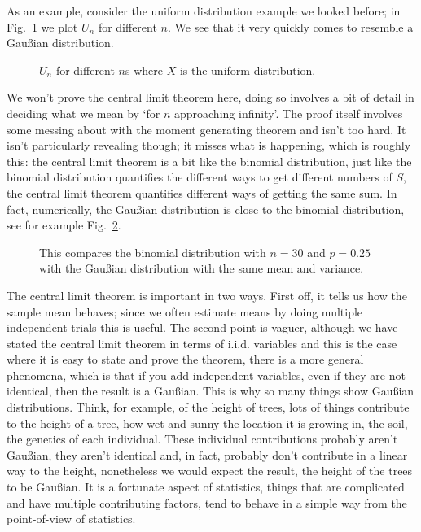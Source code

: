 \documentclass[11pt,a4paper]{scrartcl}
\begin{document}
As an example, consider the uniform distribution example we looked
before; in Fig.~\ref{fig_const} we plot $U_n$ for different $n$. We
see that it very quickly comes to resemble a Gau\ss{}ian distribution.

\begin{figure}[tb]
\begin{center}

\end{center}
\caption{$U_n$ for different $n$s where $X$ is the uniform distribution.\label{fig_const}}
\end{figure}

We won't prove the central limit theorem here, doing so involves a bit
of detail in deciding what we mean by \lq{}for $n$ approaching
infinity\rq{}. The proof itself involves some messing about with the
moment generating theorem and isn't too hard. It isn't particularly
revealing though; it misses what is happening, which is roughly this:
the central limit theorem is a bit like the binomial distribution,
just like the binomial distribution quantifies the different ways to
get different numbers of $S$, the central limit theorem quantifies
different ways of getting the same sum. In fact, numerically, the Gau\ss{}ian
distribution is close to the binomial distribution, see for example Fig.~\ref{fig_binomial}.


\begin{figure}[tb]
\begin{center}

\end{center}
\caption{This compares the binomial distribution with $n=30$ and
  $p=0.25$ with the  Gau\ss{}ian distribution with the same mean and variance.\label{fig_binomial}}
\end{figure}


The central limit theorem is important in two ways. First off, it
tells us how the sample mean behaves; since we often estimate means by
doing multiple independent trials this is useful. The second point is
vaguer, although we have stated the central limit theorem in terms of
i.i.d. variables and this is the case where it is easy to state and
prove the theorem, there is a more general phenomena, which is that if
you add independent variables, even if they are not identical, then
the result is a Gau\ss{}ian. This is why so many things show
Gau\ss{}ian distributions. Think, for example, of the height of trees,
lots of things contribute to the height of a tree, how wet and sunny
the location it is growing in, the soil, the genetics of each
individual. These individual contributions probably aren't
Gau\ss{}ian, they aren't identical and, in fact, probably don't
contribute in a linear way to the height, nonetheless we would expect
the result, the height of the trees to be Gau\ss{}ian. It is a
fortunate aspect of statistics, things that are complicated and have
multiple contributing factors, tend to behave in a simple way from the
point-of-view of statistics.


\end{document}
